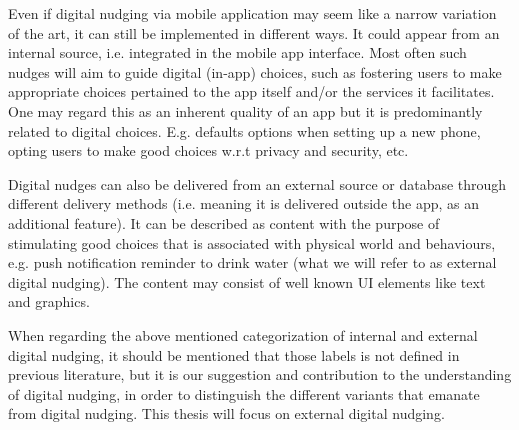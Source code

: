 Even if digital nudging via mobile application may seem like a narrow variation of the art, it can still be implemented in different ways. It could appear from an internal source, i.e. integrated in the mobile app interface. Most often such nudges will aim to guide digital (in-app) choices, such as fostering users to make appropriate choices pertained to the app itself and/or the services it facilitates. One may regard this as an inherent quality of an app but it is predominantly related to digital choices. E.g. defaults options when setting up a new phone, opting users to make good choices w.r.t privacy and security, etc.

Digital nudges can also be delivered from an external source or database through different delivery methods (i.e. meaning it is delivered outside the app, as an additional feature). It can be described as content with the purpose of stimulating good choices that is associated with physical world and behaviours, e.g. push notification reminder to drink water (what we will refer to as external digital nudging). The content may consist of well known UI elements like text and graphics. 

When regarding the above mentioned categorization of internal and external digital nudging, it should be mentioned that those labels is not defined in previous literature, but it is our suggestion and contribution to the understanding of digital nudging, in order to distinguish the different variants that emanate from digital nudging. This thesis will focus on external digital nudging. 

